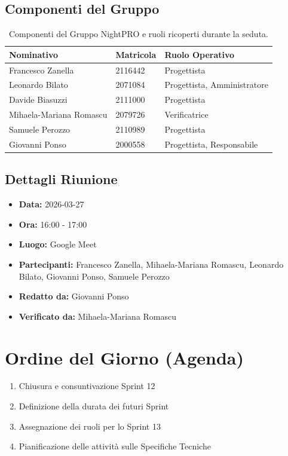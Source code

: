\documentclass[a4paper, 11pt, oneside]{scrartcl} %
\begin{document}
\subsection{Componenti del Gruppo}
\begin{table}[h!]
\centering
\begin{tabular}{@{}lll@{}}
\toprule
\textbf{Nominativo} & \textbf{Matricola} & \textbf{Ruolo Operativo} \\
\midrule
Francesco Zanella & 2116442 & Progettista \\
Leonardo Bilato & 2071084 & Progettista, Amministratore \\
Davide Biasuzzi & 2111000 & Progettista \\
Mihaela-Mariana Romascu & 2079726 & Verificatrice \\
Samuele Perozzo & 2110989 & Progettista \\
Giovanni Ponso & 2000558 & Progettista, Responsabile \\
\bottomrule
\end{tabular}
\caption{Componenti del Gruppo NightPRO e ruoli ricoperti durante la seduta.}
\end{table}

\subsection{Dettagli Riunione}
\begin{itemize}
    \item \textbf{Data:} 2026-03-27
    \item \textbf{Ora:} 16:00 - 17:00
    \item \textbf{Luogo:} Google Meet
    \item \textbf{Partecipanti:} Francesco Zanella, Mihaela-Mariana Romascu, Leonardo Bilato, Giovanni
Ponso, Samuele Perozzo
    \item \textbf{Redatto da:} Giovanni Ponso
    \item \textbf{Verificato da:} Mihaela-Mariana Romascu
\end{itemize}

\newpage
\section{Ordine del Giorno (Agenda)}
\begin{enumerate}
    \item Chiusura e consuntivazione Sprint 12
    \item Definizione della durata dei futuri Sprint
    \item Assegnazione dei ruoli per lo Sprint 13
    \item Pianificazione delle attività sulle Specifiche Tecniche
\end{enumerate}
\end{document}
